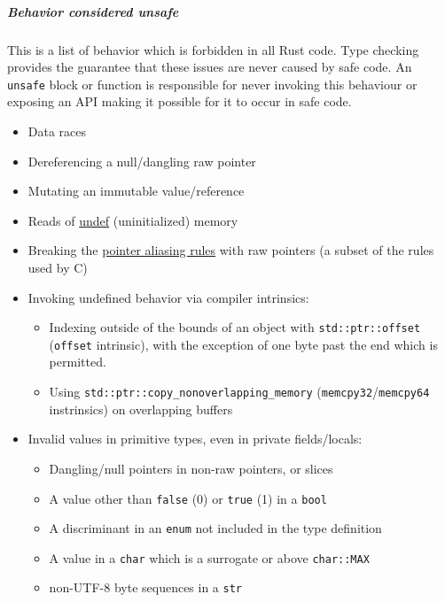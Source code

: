 \documentclass[]{article}
\begin{document}
\subparagraph{Behavior considered
unsafe}\label{behavior-considered-unsafe}

This is a list of behavior which is forbidden in all Rust code. Type
checking provides the guarantee that these issues are never caused by
safe code. An \texttt{unsafe} block or function is responsible for never
invoking this behaviour or exposing an API making it possible for it to
occur in safe code.

\begin{itemize}
\itemsep1pt\parskip0pt
\item
  Data races
\item
  Dereferencing a null/dangling raw pointer
\item
  Mutating an immutable value/reference
\item
  Reads of
  \href{http://llvm.org/docs/LangRef.html\#undefined-values}{undef}
  (uninitialized) memory
\item
  Breaking the
  \href{http://llvm.org/docs/LangRef.html\#pointer-aliasing-rules}{pointer
  aliasing rules} with raw pointers (a subset of the rules used by C)
\item
  Invoking undefined behavior via compiler intrinsics:

  \begin{itemize}
  \itemsep1pt\parskip0pt
  \item
    Indexing outside of the bounds of an object with
    \texttt{std::ptr::offset} (\texttt{offset} intrinsic), with the
    exception of one byte past the end which is permitted.
  \item
    Using \texttt{std::ptr::copy\_nonoverlapping\_memory}
    (\texttt{memcpy32}/\texttt{memcpy64} instrinsics) on overlapping
    buffers
  \end{itemize}
\item
  Invalid values in primitive types, even in private fields/locals:

  \begin{itemize}
  \itemsep1pt\parskip0pt
  \item
    Dangling/null pointers in non-raw pointers, or slices
  \item
    A value other than \texttt{false} (0) or \texttt{true} (1) in a
    \texttt{bool}
  \item
    A discriminant in an \texttt{enum} not included in the type
    definition
  \item
    A value in a \texttt{char} which is a surrogate or above
    \texttt{char::MAX}
  \item
    non-UTF-8 byte sequences in a \texttt{str}
  \end{itemize}
\end{itemize}
\end{document}
